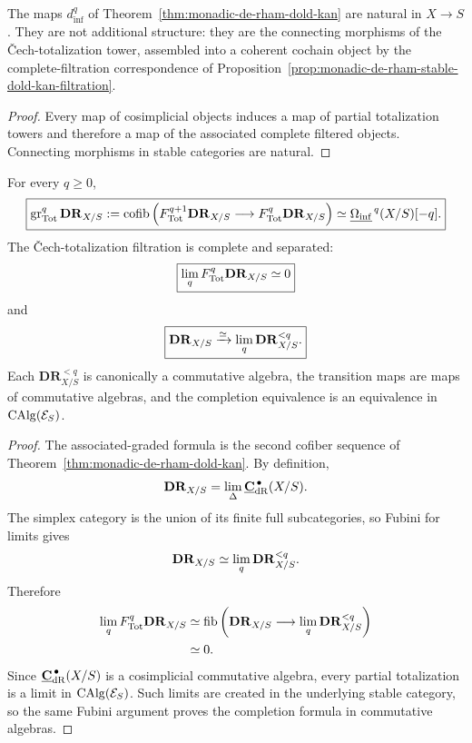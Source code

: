 \begin{proposition}
\label{prop:coherent-modal-de-rham-boundary}
The maps \(d_{\inf}^q\) of Theorem~\ref{thm:monadic-de-rham-dold-kan} are natural in \(X\to S\).
They are not additional structure: they are the connecting morphisms of the \v{C}ech-totalization
tower, assembled into a coherent cochain object by the complete-filtration correspondence of
Proposition~\ref{prop:monadic-de-rham-stable-dold-kan-filtration}.
\end{proposition}

\begin{proof}
Every map of cosimplicial objects induces a map of partial totalization towers and therefore a map of
the associated complete filtered objects.  Connecting morphisms in stable categories are natural.
\end{proof}

\begin{theorem}
\label{thm:modal-hodge-completeness}
For every \(q\geq0\),
\[
\boxed{
    \operatorname{gr}_{\mathrm{Tot}}^q\mathbf{DR}_{X/S}
    :=
    \operatorname{cofib}
    \left(
        F_{\mathrm{Tot}}^{q+1}\mathbf{DR}_{X/S}
        \longrightarrow
        F_{\mathrm{Tot}}^q\mathbf{DR}_{X/S}
    \right)
    \simeq
    \underline{\Omega_{\mathrm{inf}}}^{\,q}(X/S)[-q].
}
\]
The \v{C}ech-totalization filtration is complete and separated:
\[
\boxed{
    \operatorname*{lim}_qF_{\mathrm{Tot}}^q\mathbf{DR}_{X/S}\simeq0
}
\]
and
\[
\boxed{
    \mathbf{DR}_{X/S}
    \xrightarrow{\simeq}
    \operatorname*{lim}_q\mathbf{DR}_{X/S}^{<q}.
}
\]
Each \(\mathbf{DR}_{X/S}^{<q}\) is canonically a commutative algebra, the transition maps are maps
of commutative algebras, and the completion equivalence is an equivalence in
\(\operatorname{CAlg}(\mathcal E_S)\).
\end{theorem}

\begin{proof}
The associated-graded formula is the second cofiber sequence of
Theorem~\ref{thm:monadic-de-rham-dold-kan}.  By definition,
\[
    \mathbf{DR}_{X/S}
    =
    \operatorname*{lim}_{\Delta}
    \underline{\mathbf C}_{\mathrm{dR}}^{\,\bullet}(X/S).
\]
The simplex category is the union of its finite full subcategories, so Fubini for limits gives
\[
    \mathbf{DR}_{X/S}
    \simeq
    \operatorname*{lim}_q
    \mathbf{DR}_{X/S}^{<q}.
\]
Therefore
\[
\begin{aligned}
    \operatorname*{lim}_qF_{\mathrm{Tot}}^q\mathbf{DR}_{X/S}
    &\simeq
    \operatorname{fib}
    \left(
        \mathbf{DR}_{X/S}
        \longrightarrow
        \operatorname*{lim}_q\mathbf{DR}_{X/S}^{<q}
    \right)
    \\
    &\simeq0.
\end{aligned}
\]
Since \(\underline{\mathbf C}_{\mathrm{dR}}^{\,\bullet}(X/S)\) is a cosimplicial commutative algebra, every
partial totalization is a limit in \(\operatorname{CAlg}(\mathcal E_S)\).  Such limits are created in the
underlying stable category, so the same Fubini argument proves the completion formula in
commutative algebras.
\end{proof}

